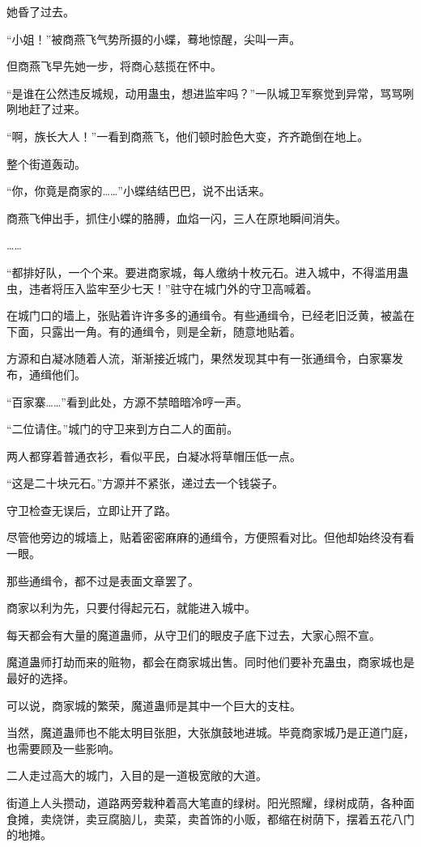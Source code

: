 \begin{this_body}
她昏了过去。

“小姐！”被商燕飞气势所摄的小蝶，蓦地惊醒，尖叫一声。

但商燕飞早先她一步，将商心慈揽在怀中。

“是谁在公然违反城规，动用蛊虫，想进监牢吗？”一队城卫军察觉到异常，骂骂咧咧地赶了过来。

“啊，族长大人！”一看到商燕飞，他们顿时脸色大变，齐齐跪倒在地上。

整个街道轰动。

“你，你竟是商家的……”小蝶结结巴巴，说不出话来。

商燕飞伸出手，抓住小蝶的胳膊，血焰一闪，三人在原地瞬间消失。

……

“都排好队，一个个来。要进商家城，每人缴纳十枚元石。进入城中，不得滥用蛊虫，违者将压入监牢至少七天！”驻守在城门外的守卫高喊着。

在城门口的墙上，张贴着许许多多的通缉令。有些通缉令，已经老旧泛黄，被盖在下面，只露出一角。有的通缉令，则是全新，随意地贴着。

方源和白凝冰随着人流，渐渐接近城门，果然发现其中有一张通缉令，白家寨发布，通缉他们。

“百家寨……”看到此处，方源不禁暗暗冷哼一声。

“二位请住。”城门的守卫来到方白二人的面前。

两人都穿着普通衣衫，看似平民，白凝冰将草帽压低一点。

“这是二十块元石。”方源并不紧张，递过去一个钱袋子。

守卫检查无误后，立即让开了路。

尽管他旁边的城墙上，贴着密密麻麻的通缉令，方便照看对比。但他却始终没有看一眼。

那些通缉令，都不过是表面文章罢了。

商家以利为先，只要付得起元石，就能进入城中。

每天都会有大量的魔道蛊师，从守卫们的眼皮子底下过去，大家心照不宣。

魔道蛊师打劫而来的赃物，都会在商家城出售。同时他们要补充蛊虫，商家城也是最好的选择。

可以说，商家城的繁荣，魔道蛊师是其中一个巨大的支柱。

当然，魔道蛊师也不能太明目张胆，大张旗鼓地进城。毕竟商家城乃是正道门庭，也需要顾及一些影响。

二人走过高大的城门，入目的是一道极宽敞的大道。

街道上人头攒动，道路两旁栽种着高大笔直的绿树。阳光照耀，绿树成荫，各种面食摊，卖烧饼，卖豆腐脑儿，卖菜，卖首饰的小贩，都缩在树荫下，摆着五花八门的地摊。


\end{this_body}
